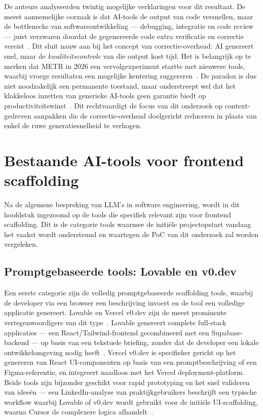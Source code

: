 De auteurs analyseerden twintig mogelijke verklaringen voor dit resultaat. De meest aannemelijke oorzaak is dat AI-tools de output van code versnellen, maar de bottlenecks van softwareontwikkeling --- debugging, integratie en code review --- juist verzwaren doordat de gegenereerde code extra verificatie en correctie vereist~\autocite{Becker2025}. Dit sluit nauw aan bij het concept van correctie-overhead: AI genereert snel, maar de \textit{kwaliteitscontrole} van die output kost tijd. Het is belangrijk op te merken dat METR in 2026 een vervolgexperiment startte met nieuwere tools, waarbij vroege resultaten een mogelijke kentering suggereren~\autocite{METRUpdate2026}. De paradox is dus niet noodzakelijk een permanente toestand, maar onderstreept wel dat het klakkeloos inzetten van generieke AI-tools geen garantie biedt op productiviteitswinst~\autocite{Becker2025,METRUpdate2026}. Dit rechtvaardigt de focus van dit onderzoek op context-gedreven aanpakken die de correctie-overhead doelgericht reduceren in plaats van enkel de ruwe generatiesnelheid te verhogen.

\section{Bestaande AI-tools voor frontend scaffolding}
\label{sec:bestaande-tools}

Na de algemene bespreking van LLM's in software engineering, wordt in dit hoofdstuk ingezoomd op de tools die specifiek relevant zijn voor frontend scaffolding. Dit is de categorie tools waarmee de initiële projectopstart vandaag het vaakst wordt ondersteund en waartegen de PoC van dit onderzoek zal worden vergeleken.

\subsection{Promptgebaseerde tools: Lovable en v0.dev}
\label{subsec:prompt-tools}

Een eerste categorie zijn de volledig promptgebaseerde scaffolding tools, waarbij de developer via een browser een beschrijving invoert en de tool een volledige applicatie genereert. Lovable en Vercel v0.dev zijn de meest prominente vertegenwoordigers van dit type~\autocite{Softr2026}. Lovable genereert complete full-stack applicaties --- een React/Tailwind-frontend gecombineerd met een Supabase-backend --- op basis van een tekstuele briefing, zonder dat de developer een lokale ontwikkelomgeving nodig heeft~\autocite{LovableCursor2026}. Vercel v0.dev is specifieker gericht op het genereren van React UI-componenten op basis van een promptbeschrijving of een Figma-referentie, en integreert naadloos met het Vercel deployment-platform. Beide tools zijn bijzonder geschikt voor rapid prototyping en het snel valideren van ideeën --- een LinkedIn-analyse van praktijkgebruikers beschrijft een typische workflow waarbij Lovable of v0.dev wordt gebruikt voor de initiële UI-scaffolding, waarna Cursor de complexere logica afhandelt~\autocite{Lindsey2025}.

